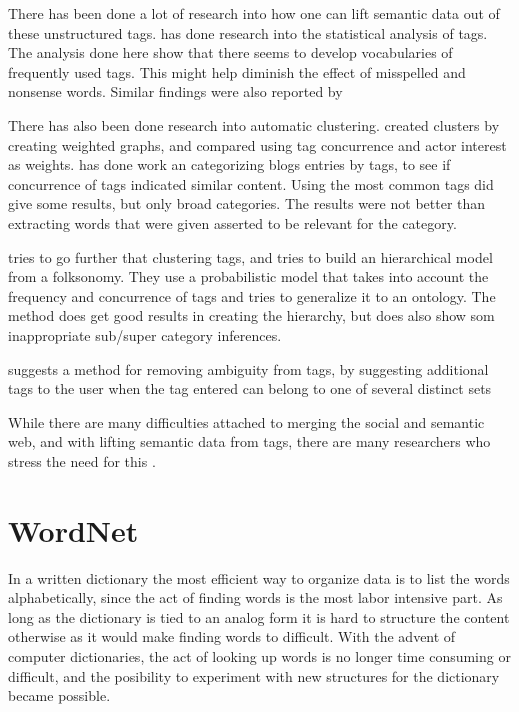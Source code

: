 There has been done a lot of research into how one can lift semantic data out of these unstructured tags.
\citet{Golder2005} has done research into the statistical analysis of tags. 
The analysis done here show that there seems to develop vocabularies of frequently used tags. 
This might help diminish the effect of misspelled and nonsense words. Similar findings were also reported by \citep{Shirky2007}

There has also been done research into automatic clustering. 
\citet{Mika2005} created clusters by creating weighted graphs, and compared using tag concurrence and actor interest as weights.  
\citet{Brooks2006} has done work an categorizing blogs entries by tags, to see if concurrence of tags indicated similar content. 
Using the most common tags did give some results, but only broad categories. The results were not better than extracting words that were given asserted to be relevant for the category.

\citep{Tang2009} tries to go further that clustering tags, and tries to build an hierarchical model from a folksonomy. 
They use a probabilistic model that takes into account the frequency and concurrence of tags and tries to generalize it to an ontology. 
The method does get good results in creating the hierarchy, but does also show som inappropriate sub/super category inferences.

\citet{Weinberger2008} suggests a method for removing ambiguity from tags,
 by suggesting additional tags to the user when the tag entered can belong to one of several distinct sets 

While there are many difficulties attached to merging the social and semantic web, and with lifting semantic data from tags, there are many researchers who stress the need for this \citep{Passant2007,Mika2005, Gruber2007}.

\section{WordNet}
In a written dictionary the most efficient way to organize data is to list the words alphabetically, 
since the act of finding words is the most labor intensive part.
As long as the dictionary is tied to an analog form it is hard to structure the content otherwise as it would make
finding words to difficult. 
With the advent of computer dictionaries, the act of looking up words is no longer time consuming or difficult, 
and the posibility to experiment with new structures for the dictionary became possible.

